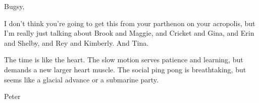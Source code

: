 

Bugsy,

I don't think you're going to get this from your parthenon on your
acropolis, but I'm really just talking about Brook and Maggie, and
Cricket and Gina, and Erin and Shelby, and Rey and Kimberly.  And
Tina.

The time is like the heart.  The slow motion serves patience and
learning, but demands a new larger heart muscle.  The social ping pong
is breathtaking, but seems like a glacial advance or a submarine
party.

Peter


\bye
